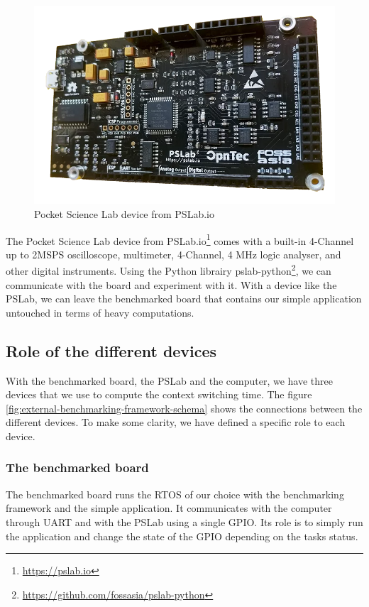 \begin{figure}[!ht]
  \centering
  \includegraphics[scale=0.25]{assets/pslab.png}
  \caption{\label{fig:pslab}Pocket Science Lab device from PSLab.io}
\end{figure}

The Pocket Science Lab device from PSLab.io\footnote{\url{https://pslab.io}} comes 
  with a built-in 4-Channel up to 2MSPS oscilloscope, multimeter, 4-Channel, 4 MHz logic analyser, and other digital instruments.
Using the Python librairy pslab-python\footnote{\url{https://github.com/fossasia/pslab-python}}, we can communicate with the board and experiment with it.
With a device like the PSLab, we can leave the benchmarked board that contains our simple application untouched in terms of heavy computations.

\subsection{Role of the different devices}

With the benchmarked board, the PSLab and the computer, we have three devices that we use to compute the context switching time.
The figure \ref{fig:external-benchmarking-framework-schema} shows the connections between the different devices.
To make some clarity, we have defined a specific role to each device.

\subsubsection{The benchmarked board}
The benchmarked board runs the RTOS of our choice with the benchmarking framework and the simple application.
It communicates with the computer through UART and with the PSLab using a single GPIO.
Its role is to simply run the application and change the state of the GPIO depending on the tasks status.

